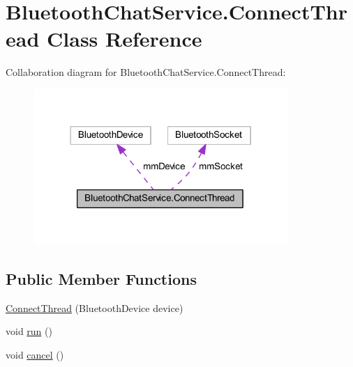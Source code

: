 \hypertarget{classcom_1_1example_1_1android_1_1_bluetooth_chat_1_1_bluetooth_chat_service_1_1_connect_thread}{\section{Bluetooth\-Chat\-Service.\-Connect\-Thread Class Reference}
\label{classcom_1_1example_1_1android_1_1_bluetooth_chat_1_1_bluetooth_chat_service_1_1_connect_thread}
}


Collaboration diagram for Bluetooth\-Chat\-Service.\-Connect\-Thread\-:
\nopagebreak
\begin{figure}[H]
\begin{center}
\leavevmode
\includegraphics[width=273pt]{classcom_1_1example_1_1android_1_1_bluetooth_chat_1_1_bluetooth_chat_service_1_1_connect_thread__coll__graph}
\end{center}
\end{figure}
\subsection*{Public Member Functions}
\begin{DoxyCompactItemize}
\item 
\hyperlink{classcom_1_1example_1_1android_1_1_bluetooth_chat_1_1_bluetooth_chat_service_1_1_connect_thread_a44953b58b3e56284605861cd8dc6c1b6}{Connect\-Thread} (Bluetooth\-Device device)
\item 
void \hyperlink{classcom_1_1example_1_1android_1_1_bluetooth_chat_1_1_bluetooth_chat_service_1_1_connect_thread_a13a43e6d814de94978c515cb084873b1}{run} ()
\item 
void \hyperlink{classcom_1_1example_1_1android_1_1_bluetooth_chat_1_1_bluetooth_chat_service_1_1_connect_thread_a02d5fa6b14e221f3012a794b905be166}{cancel} ()
\end{DoxyCompactItemize}
